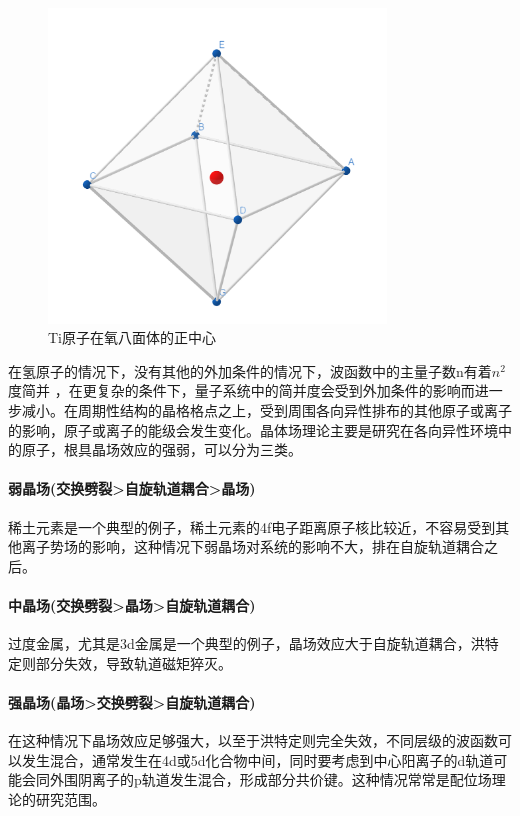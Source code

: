 \begin{figure}[h]
    \centering
\includegraphics[width=0.8\textwidth]{./pic/p001.png}
\caption{Ti原子在氧八面体的正中心}

\label{dogp01}
\end{figure}
在氢原子的情况下，没有其他的外加条件的情况下，波函数中的主量子数n有着$n^{2}$度简并
，在更复杂的条件下，量子系统中的简并度会受到外加条件的影响而进一步减小。在周期性结构的晶格格点之上，受到周围各向异性排布的其他原子或离子的影响，原子或离子的能级会发生变化。晶体场理论主要是研究在各向异性环境中的原子，根具晶场效应的强弱，可以分为三类。

\paragraph{弱晶场(交换劈裂>自旋轨道耦合>晶场)}
稀土元素是一个典型的例子，稀土元素的4f电子距离原子核比较近，不容易受到其他离子势场的影响，这种情况下弱晶场对系统的影响不大，排在自旋轨道耦合之后。
\paragraph{中晶场(交换劈裂>晶场>自旋轨道耦合)}
过度金属，尤其是3d金属是一个典型的例子，晶场效应大于自旋轨道耦合，洪特定则部分失效，导致轨道磁矩猝灭。
\paragraph{强晶场(晶场>交换劈裂>自旋轨道耦合)}
在这种情况下晶场效应足够强大，以至于洪特定则完全失效，不同层级的波函数可以发生混合，通常发生在4d或5d化合物中间，同时要考虑到中心阳离子的d轨道可能会同外围阴离子的p轨道发生混合，形成部分共价键。这种情况常常是配位场理论的研究范围。

